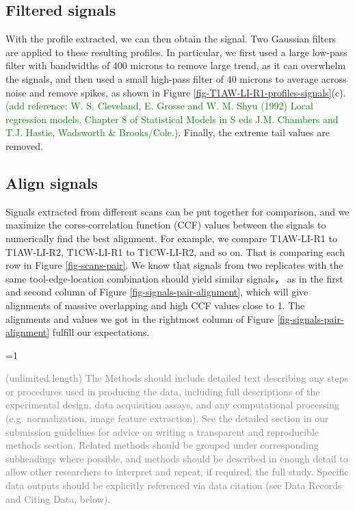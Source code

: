 \documentclass[fleqn,10pt]{wlscirep}
\newcommand{\hh}[1]{{\textcolor{Green}{#1}}}
\newcommand{\ifinstruction}{0} %
\begin{document}
\subsection{Filtered signals}\label{sec-filtered-signals}

With the profile extracted, we can then obtain the signal. Two Gaussian
filters are applied to these resulting profiles. In particular, we first
used a large low-pass filter with bandwidths of 400 microns to remove
large trend, as it can overwhelm the signals, and then used a small
high-pass filter of 40 microns to average across noise and remove
spikes, as shown in Figure \ref{fig-T1AW-LI-R1-profiles-signals}(c).
\citep{clevelandLocalRegressionModels1992}
\hh{(add reference: W. S. Cleveland, E. Grosse and W. M. Shyu (1992) Local regression models. Chapter 8 of Statistical Models in S eds J.M. Chambers and T.J. Hastie, Wadsworth \& Brooks/Cole.)}.
Finally, the extreme tail values are removed.

\subsection{Align signals}\label{sec-align-signals}

Signals extracted from different scans can be put together for
comparison, and we maximize the corss-correlation function (CCF) values
between the signals to numerically find the best alignment. For example,
we compare T1AW-LI-R1 to T1AW-LI-R2, T1CW-LI-R1 to T1CW-LI-R2, and so
on. That is comparing each row in Figure \ref{fig-scans-pair}. We know
that signals from two replicates with the same tool-edge-location
combination should yield similar signals， as in the first and second
column of Figure \ref{fig-signals-pair-alignment}, which will give
alignments of massive overlapping and high CCF values close to 1. The
alignments and values we got in the rightmost column of Figure
\ref{fig-signals-pair-alignment} fulfill our expectations.

\ifnum \ifinstruction=1

\textcolor{gray}{(unlimited length) The Methods should include detailed text describing any steps or procedures used in producing the data, including full descriptions of the experimental design, data acquisition assays, and any computational processing (e.g. normalization, image feature extraction). See the detailed section in our submission guidelines for advice on writing a transparent and reproducible methods section. Related methods should be grouped under corresponding subheadings where possible, and methods should be described in enough detail to allow other researchers to interpret and repeat, if required, the full study. Specific data outputs should be explicitly referenced via data citation (see Data Records and Citing Data, below).}
\end{document}

